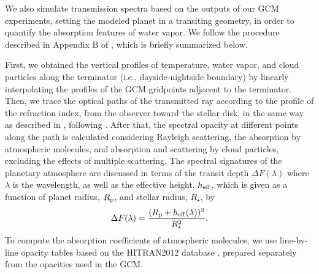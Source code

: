 \documentclass[11pt,numberedappendix,twocolappendix,]{emulateapj}
\def\wv{water vapor}
\newcommand{\yf}[1]{{\color{orange}#1}}
\begin{document}
We also simulate transmission spectra based on the outputs of our GCM experiments, setting the modeled planet in a transiting geometry, in order to quantify the absorption features of \wv{}.  
We follow the procedure described in Appendix B of \citet{Way2017}, which is briefly summarized below. 

First, we obtained the vertical profiles of temperature, water vapor, and cloud particles along the terminator (i.e., dayside-nightside boundary) by linearly interpolating the profiles of the GCM gridpoints adjacent to the terminator. 
Then, we trace the optical paths of the transmitted ray according to the profile of the refraction index, from the observer toward the stellar disk, in the same way as described in \citet{vanderWerf2008}, following \citet{Misra2014}. 
After that, the spectral opacity at different points along the path is calculated considering Rayleigh scattering, the absorption by atmospheric molecules, and absorption and scattering by cloud particles, excluding the effects of multiple scattering. 
The spectral signatures of the planetary atmosphere are discussed in terms of the transit depth $\Delta F(\lambda )$ where $\lambda $ is the wavelength, as well as the effective height, $h_{\rm eff}$, which is given \yf{as a function of planet radius, $R_{\rm p}$, and stellar radius, $R_{\star }$,} by 
\begin{equation}
\Delta F(\lambda) = \frac{( R_{\rm p} + h_{\rm eff}(\lambda)  )^2}{R_{\star }^2}. 
\end{equation}
To compute the absorption coefficients of atmospheric molecules, we use line-by-line opacity tables based on the HITRAN2012 database \citep{Rothman2013}, prepared separately from the opacities used in the GCM. 

\end{document}
